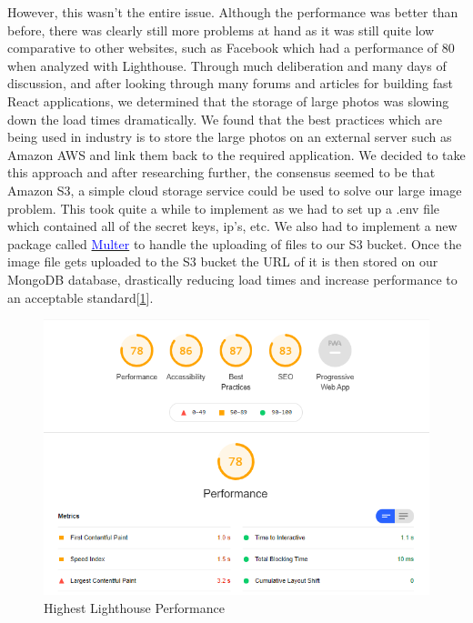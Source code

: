 However, this wasn't the entire issue. Although the performance was better than before, there was clearly still more problems at hand as it was still quite low comparative to other websites, such as Facebook which had a performance of 80 when analyzed with Lighthouse. Through much deliberation and many days of discussion, and after looking through many forums and articles for building fast React applications, we determined that the storage of large photos was slowing down the load times dramatically. We found that the best practices which are being used in industry is to store the large photos on an external server such as Amazon AWS and link them back to the required application. We decided to take this approach and after researching further, the consensus seemed to be that Amazon S3, a simple cloud storage service could be used to solve our large image problem. This took quite a while to implement as we had to set up a .env file which contained all of the secret keys, ip's, etc. We also had to implement a new package called \href{https://github.com/expressjs/multer}{\textcolor{blue}{Multer}} to handle the uploading of files to our S3 bucket. Once the image file gets uploaded to the S3 bucket the URL of it is then stored on our MongoDB database, drastically reducing load times and increase performance to an acceptable standard[\ref{fig:highest_lighthouse}].

\begin{figure}[H]
  \centering
  \includegraphics[scale=0.6]{img/best_lighthouse.jpg}
  \caption{Highest Lighthouse Performance}
  \label{fig:highest_lighthouse}
\end{figure}

